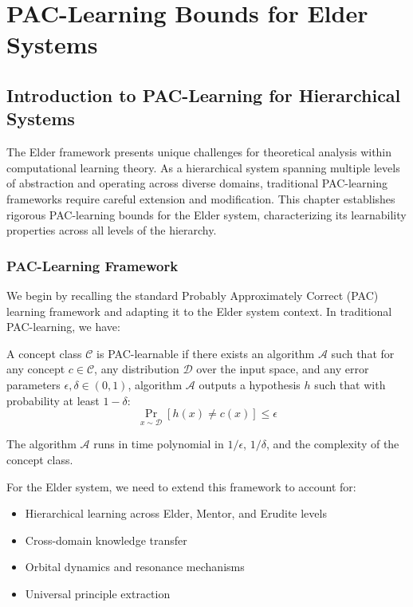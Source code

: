 \chapter{PAC-Learning Bounds for Elder Systems}

\section{Introduction to PAC-Learning for Hierarchical Systems}

The Elder framework presents unique challenges for theoretical analysis within computational learning theory. As a hierarchical system spanning multiple levels of abstraction and operating across diverse domains, traditional PAC-learning frameworks require careful extension and modification. This chapter establishes rigorous PAC-learning bounds for the Elder system, characterizing its learnability properties across all levels of the hierarchy.

\subsection{PAC-Learning Framework}

We begin by recalling the standard Probably Approximately Correct (PAC) learning framework and adapting it to the Elder system context. In traditional PAC-learning, we have:

\begin{definition}
A concept class $\mathcal{C}$ is PAC-learnable if there exists an algorithm $\mathcal{A}$ such that for any concept $c \in \mathcal{C}$, any distribution $\mathcal{D}$ over the input space, and any error parameters $\epsilon, \delta \in (0, 1)$, algorithm $\mathcal{A}$ outputs a hypothesis $h$ such that with probability at least $1 - \delta$:
\begin{equation}
\Pr_{x \sim \mathcal{D}}[h(x) \neq c(x)] \leq \epsilon
\end{equation}

The algorithm $\mathcal{A}$ runs in time polynomial in $1/\epsilon$, $1/\delta$, and the complexity of the concept class.
\end{definition}

For the Elder system, we need to extend this framework to account for:
\begin{itemize}
    \item Hierarchical learning across Elder, Mentor, and Erudite levels
    \item Cross-domain knowledge transfer
    \item Orbital dynamics and resonance mechanisms
    \item Universal principle extraction
\end{itemize}

